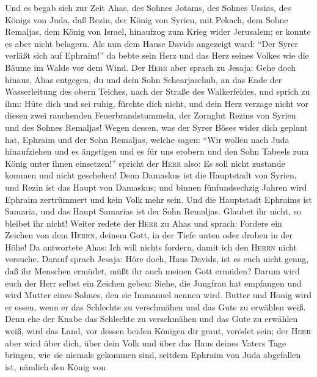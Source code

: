  Und es begab sich zur Zeit Ahas\textquotesingle, des
Sohnes Jotams, des Sohnes Ussias, des Königs von Juda, daß Rezin, der
König von Syrien, mit Pekach, dem Sohne Remaljas, dem König von Israel,
hinaufzog zum Krieg wider Jerusalem; er konnte es aber nicht belagern.
 Als nun dem Hause Davids angezeigt ward: ``Der Syrer
verläßt sich auf Ephraim!'' da bebte sein Herz und das Herz seines
Volkes wie die Bäume im Walde vor dem Wind.  Der
\textsc{Herr} aber sprach zu Jesaja: Gehe doch hinaus, Ahas entgegen, du
und dein Sohn Schearjaschub, an das Ende der Wasserleitung des obern
Teiches, nach der Straße des Walkerfeldes,  und sprich zu
ihm: Hüte dich und sei ruhig, fürchte dich nicht, und dein Herz verzage
nicht vor diesen zwei rauchenden Feuerbrandstummeln, der Zornglut Rezins
von Syrien und des Sohnes Remaljas!  Wegen dessen, was der
Syrer Böses wider dich geplant hat, Ephraim und der Sohn Remaljas,
 welche sagen: ``Wir wollen nach Juda hinaufziehen und es
ängstigen und es für uns erobern und den Sohn Tabeels zum König unter
ihnen einsetzen!''  spricht der \textsc{Herr} also: Es
soll nicht zustande kommen und nicht geschehen!  Denn
Damaskus ist die Hauptstadt von Syrien, und Rezin ist das Haupt von
Damaskus; und binnen fünfundsechzig Jahren wird Ephraim zertrümmert und
kein Volk mehr sein.  Und die Hauptstadt Ephraims ist
Samaria, und das Haupt Samarias ist der Sohn Remaljas. Glaubet ihr
nicht, so bleibet ihr nicht!  Weiter redete der
\textsc{Herr} zu Ahas und sprach:  Fordere ein Zeichen
von dem \textsc{Herrn}, deinem Gott, in der Tiefe unten oder droben in
der Höhe! Da antwortete Ahas:  Ich will nichts fordern,
damit ich den \textsc{Herrn} nicht versuche.  Darauf
sprach Jesaja: Höre doch, Haus Davids, ist es euch nicht genug, daß ihr
Menschen ermüdet, müßt ihr auch meinen Gott ermüden? 
Darum wird euch der Herr selbst ein Zeichen geben: Siehe, die Jungfrau
hat empfangen und wird Mutter eines Sohnes, den sie Immanuel nennen
wird.  Butter und Honig wird er essen, wenn er das
Schlechte zu verschmähen und das Gute zu erwählen weiß. 
Denn ehe der Knabe das Schlechte zu verschmähen und das Gute zu erwählen
weiß, wird das Land, vor dessen beiden Königen dir graut, verödet sein;
 der \textsc{Herr} aber wird über dich, über dein Volk
und über das Haus deines Vaters Tage bringen, wie sie niemals gekommen
sind, seitdem Ephraim von Juda abgefallen ist, nämlich den König von

